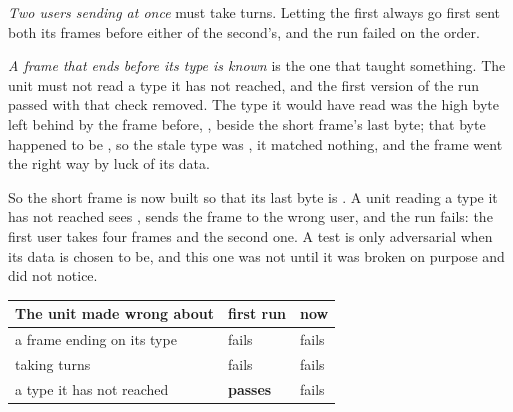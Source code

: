 \emph{Two users sending at once} must take turns. Letting the first
always go first sent both its frames before either of the second's,
and the run failed on the order.

\emph{A frame that ends before its type is known} is the one that
taught something. The unit must not read a type it has not reached,
and the first version of the run passed with that check removed. The
type it would have read was the high byte left behind by the frame
before, , beside the short frame's last byte; that byte
happened to be , so the stale type was , it
matched nothing, and the frame went the right way by luck of its
data.

So the short frame is now built so that its last byte is
. A unit reading a type it has not reached sees
, sends the frame to the wrong user, and the run fails:
the first user takes four frames and the second one. A test is only
adversarial when its data is chosen to be, and this one was not until
it was broken on purpose and did not notice.

\begin{center}\footnotesize
\begin{tabular}{@{}lll@{}}
\toprule
The unit made wrong about & first run & now \\
\midrule
a frame ending on its type & fails & fails \\
taking turns & fails & fails \\
a type it has not reached & \textbf{passes} & fails \\
\bottomrule
\end{tabular}
\end{center}


